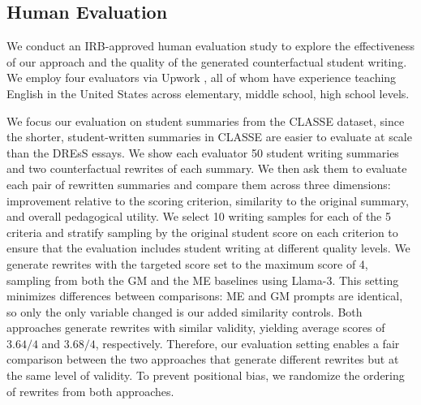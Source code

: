 \documentclass[letterpaper]{article} %
\begin{document}
\subsection{Human Evaluation}



We conduct an IRB-approved human evaluation study to explore the effectiveness of our approach and the quality of the generated counterfactual student writing. We employ four evaluators via Upwork \cite{upwork}, all of whom have experience teaching English in the United States across elementary, middle school, high school levels.

We focus our evaluation on student summaries from the CLASSE dataset, since the shorter, student-written summaries in CLASSE are easier to evaluate at scale than the DREsS essays. We show each evaluator 50 student writing summaries and two counterfactual rewrites of each summary. We then ask them to evaluate each pair of rewritten summaries and compare them across three dimensions: improvement relative to the scoring criterion, similarity to the original summary, and overall pedagogical utility. We select 10 writing samples for each of the 5 criteria and stratify sampling by the original student score on each criterion to ensure that the evaluation includes student writing at different quality levels. We generate rewrites with the targeted score set to the maximum score of 4, sampling from both the GM and the ME baselines using Llama-3. This setting minimizes differences between comparisons: ME and GM prompts are identical, so only the only variable changed is our added similarity controls. Both approaches generate rewrites with similar validity, yielding average scores of $3.64/4$ and $3.68/4$, respectively. Therefore, our evaluation setting enables a fair comparison between the two approaches that generate different rewrites but at the same level of validity. To prevent positional bias, we randomize the ordering of rewrites from both approaches.
\end{document}
